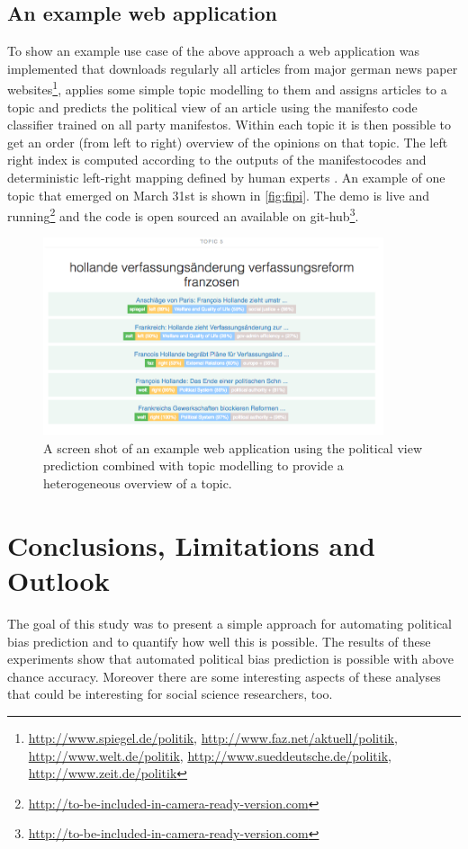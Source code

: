 \documentclass[runningheads,a4paper]{llncs}
\begin{document}
\subsection{An example web application}
To show an example use case of the above approach a web application was implemented that downloads regularly all articles from major german news paper websites\footnote{\url{http://www.spiegel.de/politik}, \url{http://www.faz.net/aktuell/politik}, \url{http://www.welt.de/politik}, \url{http://www.sueddeutsche.de/politik}, \url{http://www.zeit.de/politik}}, applies some simple topic modelling to them and assigns articles to a topic and predicts the political view of an article using the manifesto code classifier trained on all party manifestos. Within each topic it is then possible to get an order (from left to right) overview of the opinions on that topic. The left right index is computed according to the outputs of the manifestocodes and deterministic left-right mapping defined by human experts \cite{leftright}. An example of one topic that emerged on March 31st is shown in \autoref{fig:fipi}. The demo is live and running\footnote{\url{http://to-be-included-in-camera-ready-version.com}} and the code is open sourced an available on git-hub\footnote{\url{http://to-be-included-in-camera-ready-version.com}}.
\begin{figure}
\begin{center}
\includegraphics[width=10cm]{images/fipi-screenshot}
%
\end{center}
\caption{
\label{fig:fipi}
A screen shot of an example web application using the political view prediction combined with topic modelling to provide a heterogeneous overview of a topic. }
\end{figure}


\section{Conclusions, Limitations and Outlook}\label{sec:conclusion}
The goal of this study was to present a simple approach for automating political bias prediction and to quantify how well this is possible. The results of these experiments show that automated political bias prediction is possible with above chance accuracy. Moreover there are some interesting aspects of these analyses that could be interesting for social science researchers, too.
\end{document}
